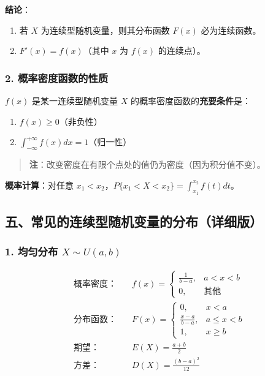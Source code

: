 \documentclass[12pt,a4paper]{ctexart}
\newenvironment{myquote}
  {\par\vspace{0.5em}\begin{quote}\sffamily\color{gray}}
  {\end{quote}\vspace{0.5em}}
\begin{document}
\textbf{结论}：
\begin{enumerate}[noitemsep]
    \item 若 $X$ 为连续型随机变量，则其分布函数 $F(x)$ 必为连续函数。
    \item $F'(x) = f(x)$（其中 $x$ 为 $f(x)$ 的连续点）。
\end{enumerate}

\subsubsection{2. 概率密度函数的性质}
$f(x)$ 是某一连续型随机变量 $X$ 的概率密度函数的\textbf{充要条件}是：
\begin{enumerate}[noitemsep]
    \item $f(x) \ge 0$（非负性）
    \item $\int_{-\infty}^{+\infty} f(x) dx = 1$（归一性）
\end{enumerate}

\begin{myquote}
    \textbf{注}：改变密度在有限个点处的值仍为密度（因为积分值不变）。
\end{myquote}

\textbf{概率计算}：对任意 $x_1 < x_2$，$P\{x_1 < X < x_2\} = \int_{x_1}^{x_2} f(t) dt$。

\subsection{五、常见的连续型随机变量的分布（详细版）}

\subsubsection{1. 均匀分布 $X \sim U(a, b)$}
\begin{align*}
    \text{概率密度：} & \quad f(x) = \begin{cases} \frac{1}{b-a}, & a < x < b \\ 0, & \text{其他} \end{cases}                 \\
    \text{分布函数：} & \quad F(x) = \begin{cases} 0, & x < a \\ \frac{x-a}{b-a}, & a \le x < b \\ 1, & x \ge b \end{cases} \\
    \text{期望：}   & \quad E(X) = \frac{a+b}{2}                                                                          \\
    \text{方差：}   & \quad D(X) = \frac{(b-a)^2}{12}
\end{align*}
\end{document}
